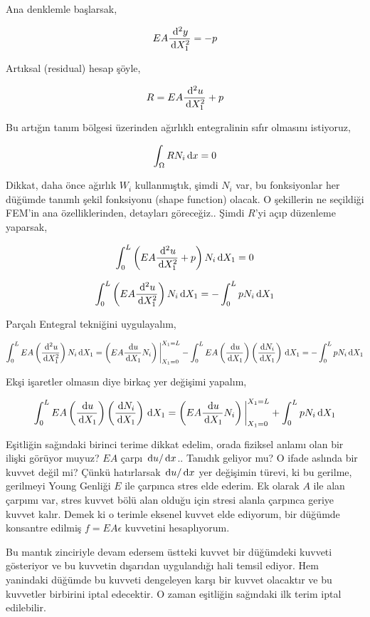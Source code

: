 \documentclass[12pt,fleqn]{article}\usepackage{../../common}
\begin{document}
Ana denklemle başlarsak,

$$
E A \frac{\,\mathrm{d}^2 y}{\,\mathrm{d} X_1^2} = -p
$$

Artıksal (residual) hesap şöyle,

$$
R = EA \frac{\,\mathrm{d}^2 u}{\,\mathrm{d} X_1^2} + p
$$

Bu artığın tanım bölgesi üzerinden ağırlıklı entegralinin sıfır olmasını
istiyoruz,

$$
\int_\Omega R N_i \,\mathrm{d} x = 0 
$$

Dikkat, daha önce ağırlık $W_i$ kullanmıştık, şimdi $N_i$ var, bu fonksiyonlar
her düğümde tanımlı şekil fonksiyonu (shape function) olacak. O şekillerin ne
seçildiği FEM'in ana özelliklerinden, detayları göreceğiz.. Şimdi $R$'yi açıp
düzenleme yaparsak,

$$
\int _{0}^{L} \left( EA \frac{\,\mathrm{d}^2 u}{\,\mathrm{d} X_1^2} + p  \right) N_i \,\mathrm{d} X_1 = 0 
$$

$$
\int _{0}^{L} \left( EA \frac{\,\mathrm{d}^2 u}{\,\mathrm{d} X_1^2} \right) N_i \,\mathrm{d} X_1 =
- \int _{0}^{L} p N_i \,\mathrm{d} X_1
$$

Parçalı Entegral tekniğini uygulayalım,

$$
\int _{0}^{L} EA \left( \frac{\,\mathrm{d}^2 u}{\,\mathrm{d} X_1^2}  \right) N_i \,\mathrm{d} X_1 =
\left( EA \frac{\,\mathrm{d} u}{\,\mathrm{d} X_1} N_i \right) \bigg\vert_{X_1=0}^{X_1=L} -
\int_{0}^{L} EA
\left( \frac{\,\mathrm{d} u}{\,\mathrm{d} X_1} \right)
\left( \frac{\,\mathrm{d} N_i}{\,\mathrm{d} X_1} \right) \,\mathrm{d} X_1 =
- \int _{0}^{L} p N_i \,\mathrm{d} X_1
$$

Ekşi işaretler olmasın diye birkaç yer değişimi yapalım,

$$
\int_{0}^{L} EA
\left( \frac{\,\mathrm{d} u}{\,\mathrm{d} X_1} \right)
\left( \frac{\,\mathrm{d} N_i}{\,\mathrm{d} X_1} \right) \,\mathrm{d} X_1
=
\left( EA \frac{\,\mathrm{d} u}{\,\mathrm{d} X_1} N_i \right) \bigg\vert_{X_1=0}^{X_1=L} +
\int _{0}^{L} p N_i \,\mathrm{d} X_1 
$$

Eşitliğin sağındaki birinci terime dikkat edelim, orada fiziksel anlamı olan bir
ilişki görüyor muyuz? $EA$ çarpı $\,\mathrm{d} u / \,\mathrm{d} x$.. Tanıdık geliyor mu?  O ifade
aslında bir kuvvet değil mi? Çünkü hatırlarsak $\,\mathrm{d} u / \,\mathrm{d} x$ yer değişimin
türevi, ki bu gerilme, gerilmeyi Young Genliği $E$ ile çarpınca stres elde
ederim. Ek olarak $A$ ile alan çarpımı var, stres kuvvet bölü alan olduğu için
stresi alanla çarpınca geriye kuvvet kalır. Demek ki o terimle eksenel kuvvet
elde ediyorum, bir düğümde konsantre edilmiş $f = E A \epsilon$ kuvvetini
hesaplıyorum. 

Bu mantık zinciriyle devam edersem üstteki kuvvet bir düğümdeki kuvveti
gösteriyor ve bu kuvvetin dışarıdan uygulandığı hali temsil ediyor. Hem
yanindaki düğümde bu kuvveti dengeleyen karşı bir kuvvet olacaktır ve
bu kuvvetler birbirini iptal edecektir. O zaman eşitliğin sağındaki
ilk terim iptal edilebilir.
\end{document}
